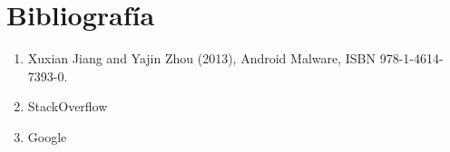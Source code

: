 \section{Bibliograf\'ia}

\begin{enumerate}[nolistsep]
 \item Xuxian Jiang and Yajin Zhou (2013), Android Malware, ISBN 978-1-4614-7393-0. 
 \item StackOverflow
 \item Google
\end{enumerate}
